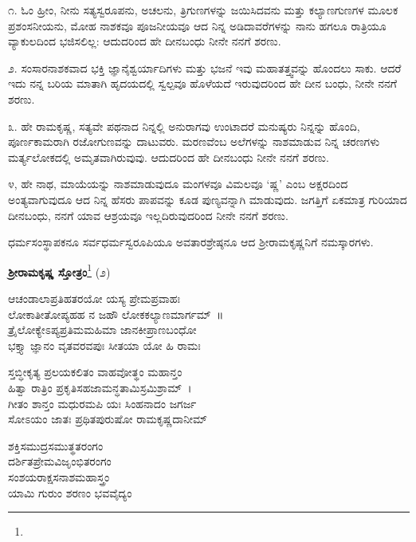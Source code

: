 ೧. ಓಂ ಹ್ರೀಂ, ನೀನು ಸತ್ಯಸ್ವರೂಪನು, ಅಚಲನು, ತ್ರಿಗುಣಗಳನ್ನು ಜಯಿಸಿದವನು ಮತ್ತು ಕಲ್ಯಾಣಗುಣಗಳ ಮೂಲಕ ಪ್ರಶಂಸನೀಯನು, ಮೋಹ ನಾಶಕವೂ ಪೂಜನೀಯವೂ ಆದ ನಿನ್ನ ಅಡಿದಾವರೆಗಳನ್ನು ನಾನು ಹಗಲೂ ರಾತ್ರಿಯೂ ವ್ಯಾಕುಲದಿಂದ ಭಜಿಸಲಿಲ್ಲ: ಆದುದರಿಂದ ಹೇ ದೀನಬಂಧು ನೀನೇ ನನಗೆ ಶರಣು.

೨. ಸಂಸಾರನಾಶಕವಾದ ಭಕ್ತಿ ಜ್ಞಾನೈಶ್ವರ್ಯಾದಿಗಳು ಮತ್ತು ಭಜನೆ ಇವು ಮಹಾತತ್ತ್ವವನ್ನು ಹೊಂದಲು ಸಾಕು. ಆದರೆ ಇದು ನನ್ನ ಬರಿಯ ಮಾತಾಗಿ ಹೃದಯದಲ್ಲಿ ಸ್ವಲ್ಪವೂ ಹೊಳೆಯದೆ ಇರುವುದರಿಂದ ಹೇ ದೀನ ಬಂಧು, ನೀನೇ ನನಗೆ ಶರಣು.

೩. ಹೇ ರಾಮಕೃಷ್ಣ, ಸತ್ಯವೇ ಪಥನಾದ ನಿನ್ನಲ್ಲಿ ಅನುರಾಗವು ಉಂಟಾದರೆ ಮನುಷ್ಯರು ನಿನ್ನನ್ನು ಹೊಂದಿ, ಪೂರ್ಣಕಾಮರಾಗಿ ರಜೋಗುಣವನ್ನು ದಾಟುವರು. ಮರಣವೆಂಬ ಅಲೆಗಳನ್ನು ನಾಶಮಾಡುವ ನಿನ್ನ ಚರಣಗಳು ಮರ್ತ್ಯಲೋಕದಲ್ಲಿ ಅಮೃತವಾಗಿರುವುವು. ಆದುದರಿಂದ ಹೇ ದೀನಬಂಧು ನೀನೇ ನನಗೆ ಶರಣು.

೪, ಹೇ ನಾಥ, ಮಾಯೆಯನ್ನು ನಾಶಮಾಡುವುದೂ ಮಂಗಳವೂ ವಿಮಲವೂ ‘ಷ್ಣ’ ಎಂಬ ಅಕ್ಷರದಿಂದ ಅಂತ್ಯವಾಗುವುದೂ ಆದ ನಿನ್ನ ಹೆಸರು ಪಾಪವನ್ನು ಕೂಡ ಪುಣ್ಯವನ್ನಾಗಿ ಮಾಡುವುದು. ಜಗತ್ತಿಗೆ ಏಕಮಾತ್ರ ಗುರಿಯಾದ ದೀನಬಂಧು, ನನಗೆ ಯಾವ ಆಶ್ರಯವೂ ಇಲ್ಲದಿರುವುದರಿಂದ ನೀನೇ ನನಗೆ ಶರಣು.

ಧರ್ಮಸಂಸ್ಥಾಪಕನೂ ಸರ್ವಧರ್ಮಸ್ವರೂಪಿಯೂ ಅವತಾರಶ್ರೇಷ್ಠನೂ ಆದ ಶ‍್ರೀರಾಮಕೃಷ್ಣನಿಗೆ ನಮಸ್ಕಾರಗಳು.

\begin{center}
\textbf{ಶ‍್ರೀರಾಮಕೃಷ್ಣ ಸ್ತೋತ್ರಂ}\footnote{} (೨)
\end{center}

\begin{myquote}
ಆಚಂಡಾಲಾಪ್ರತಿಹತರಯೋ ಯಸ್ಯ ಪ್ರೇಮಪ್ರವಾಹಃ\\ಲೋಕಾತೀತೋಪ್ಯಹಹ ನ ಜಹೌ ಲೋಕಕಲ್ಯಾಣಮಾರ್ಗಮ್~॥\\
ತ್ರೈಲೋಕ್ಯೇಽಪ್ಯಪ್ರತಿಮಮಹಿಮಾ ಜಾನಕೀಪ್ರಾಣಬಂಧೋ\\ಭಕ್ತ್ಯಾ ಜ್ಞಾನಂ ವೃತವರವಪುಃ ಸೀತಯಾ ಯೋ ಹಿ ರಾಮಃ
\end{myquote}


\begin{myquote}
ಸ್ತಬ್ಧೀಕೃತ್ಯ ಪ್ರಲಯಕಲಿತಂ ವಾಹವೋತ್ಥಂ ಮಹಾನ್ತಂ\\ಹಿತ್ವಾ ರಾತ್ರಿಂ ಪ್ರಕೃತಿಸಹಜಾಮನ್ಧತಾಮಿಸ್ರಮಿಶ್ರಾಮ್~।\\
ಗೀತಂ ಶಾನ್ತಂ ಮಧುರಮಪಿ ಯಃ ಸಿಂಹನಾದಂ ಜಗರ್ಜ\\ಸೋಽಯಂ ಜಾತಃ ಪ್ರಥಿತಪುರುಷೋ ರಾಮಕೃಷ್ಣದಾನೀಮ್
\end{myquote}


\begin{myquote}
ಶಕ್ತಿಸಮುದ್ರಸಮುತ್ಥತರಂಗಂ\\ದರ್ಶಿತಪ್ರೇಮವಿಜೃಂಭಿತರಂಗಂ\\ಸಂಶಯರಾಕ್ಷಸನಾಶಮಹಾಸ್ತ್ರಂ\\ಯಾಮಿ ಗುರುಂ ಶರಣಂ ಭವವೈದ್ಯಂ
\end{myquote}

